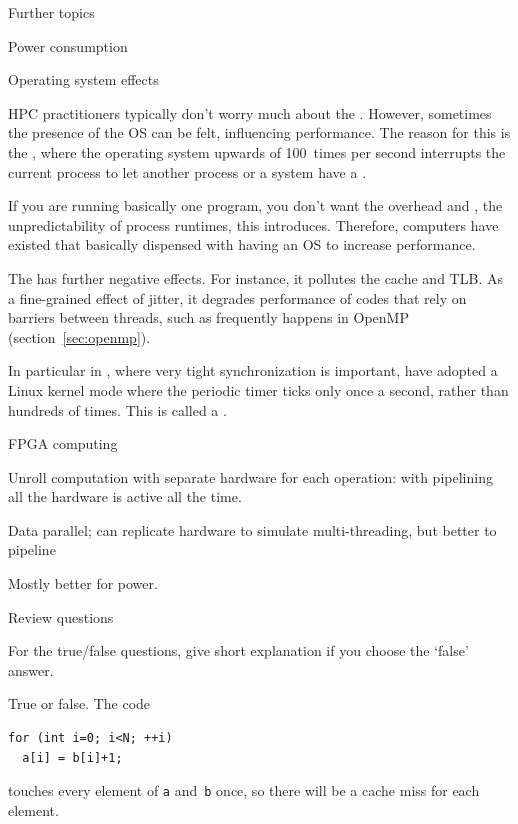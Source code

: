  {Further topics}

 {Power consumption}
\label{sec:power}


 {Operating system effects}

HPC practitioners typically don't worry much about the
. However, sometimes the presence of the \ac{OS} can be
felt, influencing performance. The reason for this is the
, where the operating system upwards
of 100~times per second interrupts the current process to let another
process or a system  have a .

If you are running basically one program, you don't want the overhead and
, the unpredictability of process
runtimes, this introduces. Therefore, computers have existed that basically dispensed
with having an \ac{OS} to increase performance.

The  has further negative
effects. For instance, it pollutes the cache and
\ac{TLB}. As a fine-grained effect of jitter, it degrades performance
of codes that rely on barriers between threads, such as frequently
happens in OpenMP (section~\ref{sec:openmp}).

In particular in , where very tight
synchronization is important, have adopted a Linux kernel mode where
the periodic timer ticks only once a second, rather than hundreds of
times. This is called a .

\begin{notready}
 {FPGA computing}

Unroll computation with separate hardware for each operation:
with pipelining all the hardware is active all the time.

Data parallel; can replicate hardware to simulate multi-threading, but
better to pipeline

Mostly better for power.
\end{notready}

 {Review questions}

For the true/false questions, give short explanation if you choose the `false' answer.

\begin{exercise}
  True or false. The code
\begin{lstlisting}
for (int i=0; i<N; ++i)
  a[i] = b[i]+1;
\end{lstlisting}
touches every element of \lstinline{a} and~\lstinline{b} once, so there will be a cache miss
for each element.
\end{exercise}

